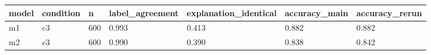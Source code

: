 \begin{tabular}{lllllll}
\toprule
model & condition & n & label\_agreement & explanation\_identical & accuracy\_main & accuracy\_rerun \\
\midrule
m1 & c3 & 600 & 0.993 & 0.413 & 0.882 & 0.882 \\
m2 & c3 & 600 & 0.990 & 0.390 & 0.838 & 0.842 \\
\bottomrule
\end{tabular}
